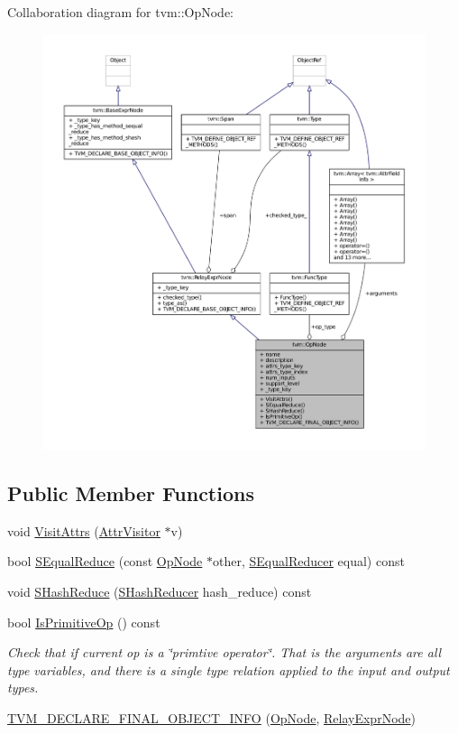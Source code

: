 Collaboration diagram for tvm\+:\+:Op\+Node\+:
\nopagebreak
\begin{figure}[H]
\begin{center}
\leavevmode
\includegraphics[width=350pt]{classtvm_1_1OpNode__coll__graph}
\end{center}
\end{figure}
\subsection*{Public Member Functions}
\begin{DoxyCompactItemize}
\item 
void \hyperlink{classtvm_1_1OpNode_a9a5aacb190b2c4ead60b2810bd9053f4}{Visit\+Attrs} (\hyperlink{classtvm_1_1AttrVisitor}{Attr\+Visitor} $\ast$v)
\item 
bool \hyperlink{classtvm_1_1OpNode_a23237d4a1ca4e21371d5ed0ac3520725}{S\+Equal\+Reduce} (const \hyperlink{classtvm_1_1OpNode}{Op\+Node} $\ast$other, \hyperlink{classtvm_1_1SEqualReducer}{S\+Equal\+Reducer} equal) const 
\item 
void \hyperlink{classtvm_1_1OpNode_abe8c1e8f86a4b62187a233174edce575}{S\+Hash\+Reduce} (\hyperlink{classtvm_1_1SHashReducer}{S\+Hash\+Reducer} hash\+\_\+reduce) const 
\item 
bool \hyperlink{classtvm_1_1OpNode_a285c8dc0ccec2ca34386271d1b338506}{Is\+Primitive\+Op} () const 
\begin{DoxyCompactList}\small\item\em Check that if current op is a \char`\"{}primtive operator\char`\"{}. That is the arguments are all type variables, and there is a single type relation applied to the input and output types. \end{DoxyCompactList}\item 
\hyperlink{classtvm_1_1OpNode_ade027d3176f48e7127be6ff08c723306}{T\+V\+M\+\_\+\+D\+E\+C\+L\+A\+R\+E\+\_\+\+F\+I\+N\+A\+L\+\_\+\+O\+B\+J\+E\+C\+T\+\_\+\+I\+N\+FO} (\hyperlink{classtvm_1_1OpNode}{Op\+Node}, \hyperlink{classtvm_1_1RelayExprNode}{Relay\+Expr\+Node})
\end{DoxyCompactItemize}
